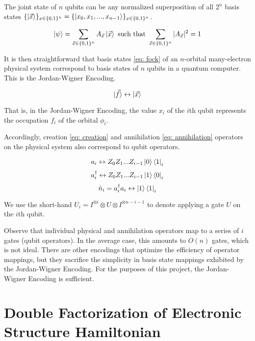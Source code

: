 The joint state of $n$ qubits can be any normalized superposition of all $2^n$ basis states $\{\ket{\vec{x}}\}_{x \in \{0, 1\}^n} = \{\ket{x_0, x_1, ..., x_{n - 1}}\}_{x \in \{0, 1\}^n}$.

\begin{equation}
    \ket{\psi} = \sum_{\vec{x} \in \{0, 1\}^n} A_{\vec{x}} \ket{\vec{x}} \text{ such that } \sum_{\vec{x} \in \{0, 1\}^n} |A_{\vec{x}}|^2 = 1
\end{equation}

It is then straightforward that basis states \eqref{eq: fock} of an $n$-orbital many-electron physical system correspond to basis states of $n$ qubits in a quantum computer. This is the Jordan-Wigner Encoding.

\begin{equation}
    \ket{\vec{f}} \leftrightarrow \ket{\vec{x}}
\end{equation}

That is, in the Jordan-Wigner Encoding, the value $x_i$ of the $i$th qubit represents the occupation $f_i$ of the orbital $\phi_i$.

Accordingly, creation \eqref{eq: creation} and annihilation \eqref{eq: annihilation} operators on the physical system also correspond to qubit operators.

\begin{equation}
    a_i \leftrightarrow Z_0Z_1...Z_{i - 1}\ket{0}\bra{1}_i \label{eq: JWdown}
\end{equation}
\begin{equation}
    a^\dag_i \leftrightarrow Z_0Z_1...Z_{i - 1}\ket{1}\bra{0}_i \label{eq: JWup}
\end{equation}
\begin{equation}
    \hat{n}_i = a^\dag_ia_i \leftrightarrow \ket{1}\bra{1}_i
\end{equation}

We use the short-hand $U_i = I^{\otimes i}\otimes U \otimes I^{\otimes n - i - 1}$ to denote applying a gate $U$ on the $i$th qubit.

Observe that individual physical and annihilation operators map to a series of $i$ gates (qubit operators). In the average case, this amounts to $O(n)$ gates, which is not ideal. There are other encodings that optimize the efficiency of operator mappings, but they sacrifice the simplicity in basis state mappings exhibited by the Jordan-Wigner Encoding. For the purposes of this project, the Jordan-Wigner Encoding is sufficient.

\section{Double Factorization of Electronic Structure Hamiltonian}

